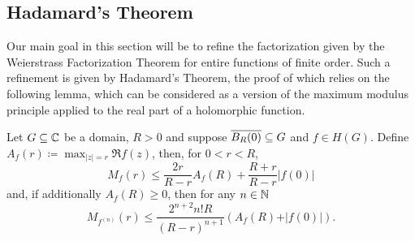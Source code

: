 \subsection{Hadamard's Theorem}
\label{sec:hadamards-theorem}

Our main goal in this section will be to refine the factorization given by the Weierstrass Factorization Theorem for entire functions of finite order. Such a refinement is given by Hadamard's Theorem, the proof of which relies on the following lemma, which can be considered as a version of the maximum modulus principle applied to the real part of a holomorphic function.

\begin{lemma} \label{lem:borel-caratheodory}
    Let $G \subseteq \mathbb{C}$ be a domain, $R > 0$ and suppose $\overline{B_R(0)} \subseteq G$ and $f \in H(G)$. Define $ A_f(r) \coloneqq \max_{\vert z \vert = r} \Re f(z) $, then, for $0 < r < R$,
    \begin{equation} \label{eq:borel-caratheodory-1}
        M_f(r) \leq \frac{2r}{R - r} A_f(R) + \frac{R + r}{R - r} \vert f(0) \vert
    \end{equation}
    and, if additionally $A_f(R) \geq 0$, then for any $n \in \mathbb{N}$
    \begin{equation} \label{eq:borel-caratheodory-2}
        M_{f^{(n)}}(r) \leq \frac{2^{n+2} n! R}{(R - r)^{n+1}} (A_f(R) + \vert f(0) \vert).
    \end{equation}
\end{lemma}

